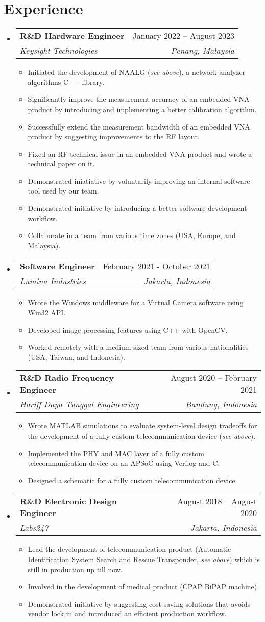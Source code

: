 \documentclass[letterpaper,11pt]{article}
\makeatletter
\newcommand{\resumeItem}[1]{
  \item\small{
    {#1 \vspace{-2pt}}
  }
}
\newcommand{\resumeSubheading}[4]{
  \vspace{-2pt}\item
    \begin{tabular*}{0.97\textwidth}[t]{l@{\extracolsep{\fill}}r}
      \textbf{#1} & #2 \\
      \textit{\small#3} & \textit{\small #4} \\
    \end{tabular*}\vspace{-7pt}
}
\newcommand{\resumeSubHeadingListStart}{\begin{itemize}[leftmargin=0.15in, label={}]}
\newcommand{\resumeSubHeadingListEnd}{\end{itemize}}
\newcommand{\resumeItemListStart}{\begin{itemize}}
\newcommand{\resumeItemListEnd}{\end{itemize}\vspace{-5pt}}
\makeatother
\begin{document}
\section{Experience}
\resumeSubHeadingListStart
\resumeSubheading
  {R\&D Hardware Engineer}{January 2022 -- August 2023}
  {Keysight Technologies}{Penang, Malaysia}
\resumeItemListStart
\resumeItem{Initiated the development of NAALG (\textit{see above}), a network
analyzer algorithms C++ library.}
\resumeItem{Significantly improve the measurement accuracy of an embedded VNA
product by introducing and implementing a better calibration algorithm.}
\resumeItem{Successfully extend the measurement bandwidth of an embedded VNA
product by suggesting improvements to the RF layout.}
\resumeItem{Fixed an RF technical issue in an embedded VNA product and wrote a
technical paper on it.}
\resumeItem{Demonstrated iniatiative by voluntarily improving an internal
software tool used by our team.}
\resumeItem{Demonstrated initiative by introducing a better software
development workflow.}
\resumeItem{Collaborate in a team from various time zones (USA, Europe, and
Malaysia).}
\resumeItemListEnd

\resumeSubheading
  {Software Engineer}{February 2021 - October 2021}
  {Lumina Industries}{Jakarta, Indonesia}
\resumeItemListStart
\resumeItem{Wrote the Windows middleware for a Virtual Camera software using
Win32 API.}
\resumeItem{Developed image processing features using C++ with OpenCV.}
\resumeItem{Worked remotely with a medium-sized team from various nationalities
(USA, Taiwan, and Indonesia).}
\resumeItemListEnd

\resumeSubheading
  {R\&D Radio Frequency Engineer}{August 2020 -- February 2021}
  {Hariff Daya Tunggal Engineering}{Bandung, Indonesia}
\resumeItemListStart
\resumeItem{Wrote MATLAB simulations to evaluate system-level design tradeoffs
for the development of a fully custom telecommunication device (\textit{see
above}).}
\resumeItem{Implemented the PHY and MAC layer of a fully custom
telecommunication device on an APSoC using Verilog and C.}
\resumeItem{Designed a schematic for a fully custom telecommunication device.}
\resumeItemListEnd

\resumeSubheading
  {R\&D Electronic Design Engineer}{August 2018 -- August 2020}
  {Labs247}{Jakarta, Indonesia}
\resumeItemListStart
\resumeItem{Lead the development of telecommunication product (Automatic
Identification System Search and Rescue Transponder, \textit{see above}) which
is still in production up till now.}
\resumeItem{Involved in the development of medical product (CPAP BiPAP
machine).}
\resumeItem{Demonstrated initiative by suggesting cost-saving solutions that
avoids vendor lock in and introduced an efficient production workflow.}
\resumeItemListEnd
\resumeSubHeadingListEnd

\end{document}
